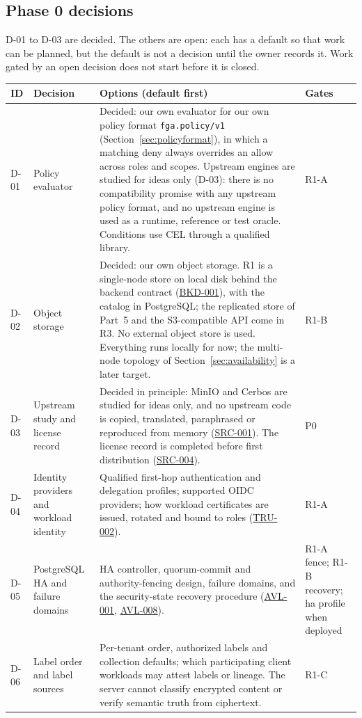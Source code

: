 \documentclass[11pt,a4paper]{article}
\newcommand{\code}[1]{{\small\nolinkurl{#1}}}
\newcommand{\rr}[1]{\hyperlink{req:#1}{#1}}
\begin{document}
\subsection{Phase 0 decisions}\label{sec:decisions}
D-01 to D-03 are decided. The others are open: each has a default so that work can be planned, but the default is not a decision until the owner records it. Work gated by an open decision does not start before it is closed.
\begin{longtable}{@{}P{0.06\textwidth}P{0.22\textwidth}P{0.46\textwidth}P{0.12\textwidth}@{}}
\toprule ID & Decision & Options (default first) & Gates\\\midrule\endhead
D-01 & Policy evaluator & Decided: our own evaluator for our own policy format \code{fga.policy/v1} (Section~\ref{sec:policyformat}), in which a matching deny always overrides an allow across roles and scopes. Upstream engines are studied for ideas only (D-03): there is no compatibility promise with any upstream policy format, and no upstream engine is used as a runtime, reference or test oracle. Conditions use CEL through a qualified library. & R1-A\\
D-02 & Object storage & Decided: our own object storage. R1 is a single-node store on local disk behind the backend contract (\rr{BKD-001}), with the catalog in PostgreSQL; the replicated store of Part~5 and the S3-compatible API come in R3. No external object store is used. Everything runs locally for now; the multi-node topology of Section~\ref{sec:availability} is a later target. & R1-B\\
D-03 & Upstream study and license record & Decided in principle: MinIO and Cerbos are studied for ideas only, and no upstream code is copied, translated, paraphrased or reproduced from memory (\rr{SRC-001}). The license record is completed before first distribution (\rr{SRC-004}). & P0\\
D-04 & Identity providers and workload identity & Qualified first-hop authentication and delegation profiles; supported OIDC providers; how workload certificates are issued, rotated and bound to roles (\rr{TRU-002}). & R1-A\\
D-05 & PostgreSQL HA and failure domains & HA controller, quorum-commit and authority-fencing design, failure domains, and the security-state recovery procedure (\rr{AVL-001}, \rr{AVL-008}). & R1-A fence; R1-B recovery; ha profile when deployed\\
D-06 & Label order and label sources & Per-tenant order, authorized labels and collection defaults; which participating client workloads may attest labels or lineage. The server cannot classify encrypted content or verify semantic truth from ciphertext. & R1-C\\

\end{longtable}
\end{document}
